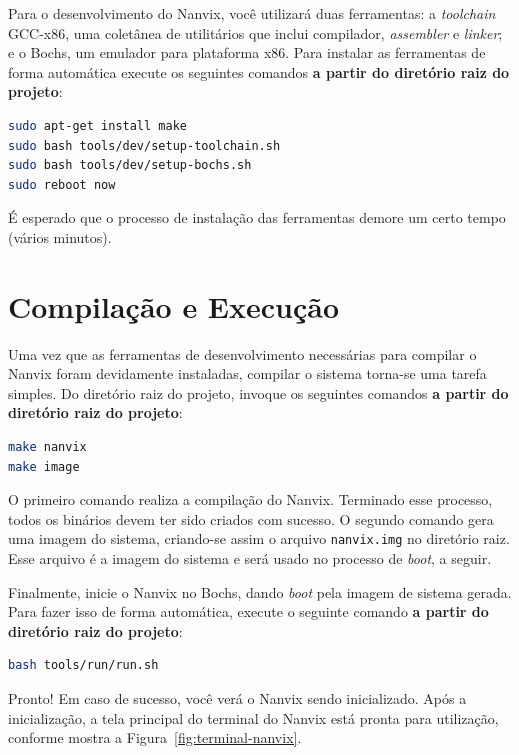 \documentclass[11pt]{article}
\begin{document}
Para o desenvolvimento do Nanvix, você utilizará duas ferramentas: a \textit{toolchain} GCC-x86, uma coletânea de utilitários que inclui compilador, \textit{assembler} e \textit{linker}; e o Bochs, um emulador para plataforma x86. Para instalar as ferramentas de forma automática execute os seguintes comandos \textbf{a partir do diretório raiz do projeto}: \\


\begin{lstlisting}[language=bash,numbers=none,frame=single]
sudo apt-get install make
sudo bash tools/dev/setup-toolchain.sh
sudo bash tools/dev/setup-bochs.sh
sudo reboot now
\end{lstlisting}

É esperado que o processo de instalação das ferramentas demore um certo tempo (vários minutos).

\section{Compilação e Execução}
\label{sec:compilacao}

Uma vez que as ferramentas de desenvolvimento necessárias para compilar o Nanvix foram devidamente instaladas, compilar o sistema torna-se uma tarefa simples. Do diretório raiz do projeto, invoque os seguintes comandos \textbf{a partir do diretório raiz do projeto}:\\

\begin{lstlisting}[language=bash,numbers=none,frame=single]
make nanvix
make image
\end{lstlisting}

O primeiro comando realiza a compilação do Nanvix. Terminado esse processo, todos os binários devem ter sido criados com sucesso. O segundo comando gera uma imagem do sistema, criando-se assim o arquivo \texttt{nanvix.img} no diretório raiz. Esse arquivo é a imagem do sistema e será usado no processo de \textit{boot}, a seguir.

Finalmente, inicie o Nanvix no Bochs, dando \textit{boot} pela imagem de sistema gerada. Para fazer isso de forma automática, execute o seguinte comando \textbf{a partir do diretório raiz do projeto}:\\

\begin{lstlisting}[language=bash,numbers=none,frame=single]
bash tools/run/run.sh
\end{lstlisting}

Pronto! Em caso de sucesso, você verá o Nanvix sendo inicializado. Após a inicialização, a tela principal do terminal do Nanvix está pronta para utilização, conforme mostra a Figura~\ref{fig:terminal-nanvix}.
\end{document}
